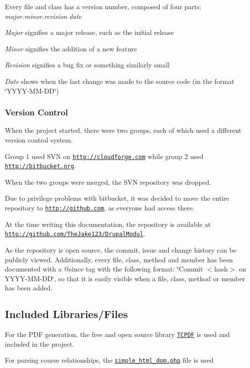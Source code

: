Every file and class has a version number, composed of four parts\+: {\itshape major.\+minor.\+revision} {\itshape date} 
\begin{DoxyItemize}
\item {\itshape Major} signifies a major release, such as the initial release
\item {\itshape Minor} signifies the addition of a new feature
\item {\itshape Revision} signifies a bug fix or something similarly small
\item {\itshape Date} shows when the last change was made to the source code (in the format \char`\"{}\+Y\+Y\+Y\+Y-\/\+M\+M-\/\+D\+D\char`\"{})
\end{DoxyItemize}\hypertarget{index_versioncontrol}{}\subsubsection{Version Control}\label{index_versioncontrol}

\begin{DoxyItemize}
\item When the project started, there were two groups, each of which used a different version control system.
\item Group 1 used S\+V\+N on \href{http://cloudforge.com}{\tt http\+://cloudforge.\+com} while group 2 used \href{http://bitbucket.org}{\tt http\+://bitbucket.\+org}.
\item When the two groups were merged, the S\+V\+N repository was dropped.
\item Due to privilege problems with bitbucket, it was decided to move the entire repository to \href{http://github.com}{\tt http\+://github.\+com}, as everyone had access there.
\item At the time writing this documentation, the repository is available at \href{http://github.com/TheJake123/DrupalModul}{\tt http\+://github.\+com/\+The\+Jake123/\+Drupal\+Modul}.
\end{DoxyItemize}

As the repository is open source, the commit, issue and change history can be publicly viewed. Additionally, every file, class, method and member has been documented with a {\ttfamily @since} tag with the following format\+: \char`\"{}\+Commit $<$hash$>$ on Y\+Y\+Y\+Y-\/\+M\+M-\/\+D\+D\char`\"{}, so that it is easily visible when a file, class, method or member has been added.\hypertarget{index_Included}{}\subsection{Included Libraries/\+Files}\label{index_Included}
For the P\+D\+F generation, the free and open source library \href{http://www.tcpdf.org/}{\tt T\+C\+P\+D\+F} is used and included in the project.

For parsing course relationships, the \href{http://simplehtmldom.sourceforge.net/}{\tt simple\+\_\+html\+\_\+dom.\+php} file is used 